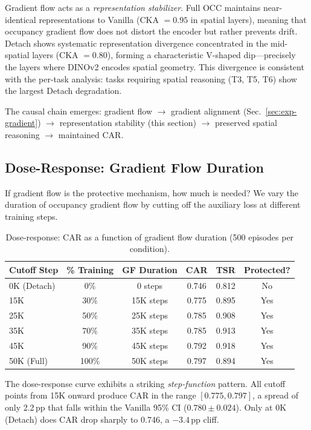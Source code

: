\documentclass[letterpaper]{article}
\begin{document}
Gradient flow acts as a \emph{representation stabilizer}. Full OCC maintains near-identical representations to Vanilla (CKA $= 0.95$ in spatial layers), meaning that occupancy gradient flow does not distort the encoder but rather prevents drift. Detach shows systematic representation divergence concentrated in the mid-spatial layers (CKA $= 0.80$), forming a characteristic V-shaped dip---precisely the layers where DINOv2 encodes spatial geometry. This divergence is consistent with the per-task analysis: tasks requiring spatial reasoning (T3, T5, T6) show the largest Detach degradation.

The causal chain emerges: gradient flow $\to$ gradient alignment (Sec.~\ref{sec:exp-gradient}) $\to$ representation stability (this section) $\to$ preserved spatial reasoning $\to$ maintained CAR.

\subsection{Dose-Response: Gradient Flow Duration}
\label{sec:exp-dose}

If gradient flow is the protective mechanism, how much is needed? We vary the duration of occupancy gradient flow by cutting off the auxiliary loss at different training steps.

\begin{table}[h]
\centering
\caption{Dose-response: CAR as a function of gradient flow duration (500 episodes per condition).}
\label{tab:dose}
\begin{tabular}{lccccc}
\toprule
Cutoff Step & \% Training & GF Duration & CAR & TSR & Protected? \\
\midrule
0K (Detach) & 0\%  & 0 steps  & 0.746 & 0.812 & No  \\
15K         & 30\% & 15K steps & 0.775 & 0.895 & Yes \\
25K         & 50\% & 25K steps & 0.785 & 0.908 & Yes \\
35K         & 70\% & 35K steps & 0.785 & 0.913 & Yes \\
45K         & 90\% & 45K steps & 0.792 & 0.918 & Yes \\
50K (Full)  & 100\% & 50K steps & 0.797 & 0.894 & Yes \\
\bottomrule
\end{tabular}
\end{table}

The dose-response curve exhibits a striking \emph{step-function} pattern. All cutoff points from 15K onward produce CAR in the range $[0.775, 0.797]$, a spread of only 2.2\,pp that falls within the Vanilla 95\% CI ($0.780 \pm 0.024$). Only at 0K (Detach) does CAR drop sharply to 0.746, a $-3.4$\,pp cliff.
\end{document}
